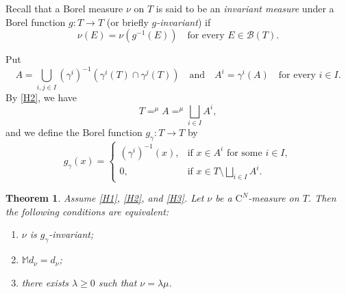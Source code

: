 \documentclass{amsart}
\theoremstyle{plain}%
\newtheorem{theorem}{Theorem}[section]
\theoremstyle{definition}
\theoremstyle{remark}
\begin{document}
Recall that a Borel measure $\nu$ on $T$ is said to be an \textit{invariant measure} under a Borel function $g\colon T\to T$ (or briefly \textit{$g$-invariant}) if
\begin{equation*}
\nu(E)=\nu(g^{-1}(E))\quad\text{for every }E\in\mathcal{B}(T).
\end{equation*}

Put
\begin{equation*}\label{equ:definition_of_the_family_Ai}
A=\bigcup_{i,j\in I}(\gamma^i)^{-1}(\gamma^i(T)\cap \gamma^j(T))\quad\text{and}\quad
A^i=\gamma^i(A)\quad\text{for every }i\in I.
\end{equation*}
By \ref{H2}, we have
\begin{equation}\label{equ:r_disjointness_of_gamma1}
T\mathop{=}^\mu A\mathop{=}^\mu \bigsqcup_{i\in I} A^i,
\end{equation}
and we define the Borel function $g_\gamma\colon T\to T$ by
\begin{equation}\label{equ:definition_of_g_gamma}
g_\gamma(x)=\begin{cases}
(\gamma^i)^{-1}(x),&\text{if }x\in A^i\text{ for some }i\in I,\\
0,&\text{if }x\in T\setminus\bigsqcup_{i\in I}A^i.
\end{cases}
\end{equation}

\begin{theorem}\label{thm:IM} 
Assume \ref{H1}, \ref{H2}, and \ref{H3}. Let $\nu$ be a $\mathrm{C}^N$-measure on $T$. Then the following conditions are equivalent:
\begin{enumerate}[label=$(\roman*)$]
\item\label{equ:IM(i)} $\nu$ is $g_\gamma$-invariant; 
\item\label{equ:IM(ii)}  $\mathbb{M}d_\nu=d_\nu$;
\item\label{equ:IM(iii)} there exists $\lambda\ge 0$ such that $\nu=\lambda\mu$.
\end{enumerate}
\end{theorem}
\end{document}
